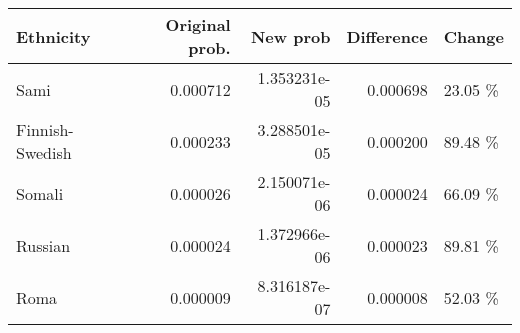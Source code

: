 \begin{tabular}{lrrrl}
\toprule
      Ethnicity &  Original prob. &     New prob &  Difference &  Change \\
\midrule
           Sami &        0.000712 & 1.353231e-05 &    0.000698 & 23.05 \% \\
Finnish-Swedish &        0.000233 & 3.288501e-05 &    0.000200 & 89.48 \% \\
         Somali &        0.000026 & 2.150071e-06 &    0.000024 & 66.09 \% \\
        Russian &        0.000024 & 1.372966e-06 &    0.000023 & 89.81 \% \\
           Roma &        0.000009 & 8.316187e-07 &    0.000008 & 52.03 \% \\
\bottomrule
\end{tabular}
